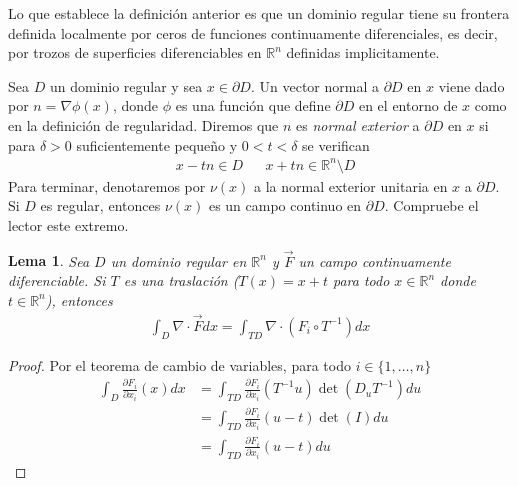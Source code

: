 \documentclass{report}
\newcommand{\realNumbers}{\mathbb{R}}
\newtheorem{lemma}{Lema}
\theoremstyle{remark}
\begin{document}
  Lo que establece la definición anterior es que un dominio regular tiene su frontera definida localmente por ceros de funciones continuamente diferenciales, es decir, por trozos de superficies diferenciables en \(\realNumbers^n\) definidas implicitamente.

  Sea \(D\) un dominio regular y sea \(x \in \partial D\).
  Un vector normal a \(\partial D\) en \(x\) viene dado por \(n = \nabla \phi(x)\), donde \(\phi\) es una función que define \(\partial D\) en el entorno de \(x\) como en la definición de regularidad.
  Diremos que \(n\) es \emph{normal exterior} a \(\partial D\) en \(x\) si para \(\delta > 0\) suficientemente pequeño y \(0 < t < \delta\) se verifican
  \begin{align}
    &x - t n \in D
    &&x + t n \in \realNumbers^n \setminus D
  \end{align}
  Para terminar, denotaremos por \(\nu(x)\) a la normal exterior unitaria en \(x\) a \(\partial D\).
  Si \(D\) es regular, entonces \(\nu(x)\) es un campo continuo en \(\partial D\).
  Compruebe el lector este extremo.


  \begin{lemma}
    Sea \(D\) un dominio regular en \(\realNumbers^n\) y \(\vec{F}\)  un campo continuamente diferenciable.
    Si \(T\) es una traslación (\(T(x) = x + t\) para todo \(x \in \realNumbers^n\) donde \(t \in \realNumbers^n\)), entonces
    \begin{align}
      \int_D
        \nabla \cdot \vec{F}
      dx
      =
      \int_{T D}
        \nabla \cdot (F_i \circ T^{- 1})
      dx
    \end{align}
  \end{lemma}
  \begin{proof}
    Por el teorema de cambio de variables, para todo \(i \in \{1, \dots, n\}\)
    \begin{align}
      \int_D \frac{\partial F_i}{\partial x_i}(x) dx
      &=
      \int_{T D}
        \frac{\partial F_i}{\partial x_i}(T^{- 1} u)
        \det\left(D_u T^{-1}\right)
      du
      \\
      &=
      \int_{T D}
        \frac{\partial F_i}{\partial x_i}(u - t)
        \det(I)
      du
      \\
      &=
      \int_{T D}
        \frac{\partial F_i}{\partial x_i}(u - t)
      du
    \end{align}
  \end{proof}
\end{document}

